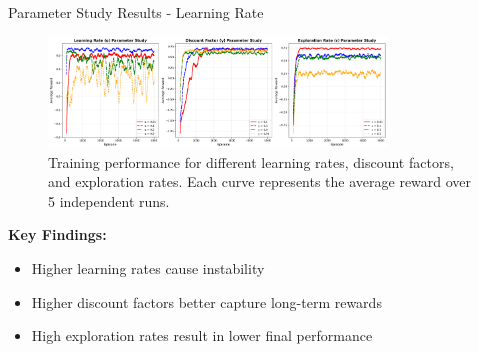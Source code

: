 \documentclass[aspectratio=169]{beamer}
\begin{document}
\begin{frame}{Parameter Study Results - Learning Rate}
    \begin{center}
        
        \begin{figure}[h]
            \centering
            \includegraphics[width=0.8\textwidth]{./Results/parameter_study_curves.png}
            \caption{Training performance for different learning rates, discount factors, and exploration rates. Each curve represents the average reward over 5 independent runs.}
        \end{figure}
        
        \textbf{Key Findings:}
        \begin{itemize}
            \item Higher learning rates cause instability
            \item Higher discount factors better capture long-term rewards
            \item High exploration rates result in lower final performance
        \end{itemize}
    \end{center}
\end{frame}

        
        
\end{document}
